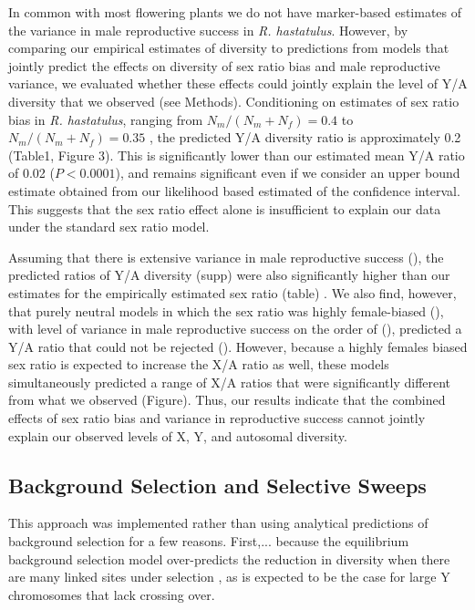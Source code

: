 \documentclass[9pt,twocolumn,twoside]{gsajnl}
\begin{document}
In common with most flowering plants we do not have marker-based estimates of the variance in male reproductive success in \textit{R. hastatulus}. However, by comparing our empirical estimates of diversity to predictions from models that jointly predict the effects on diversity of sex ratio bias and male reproductive variance, we evaluated whether these effects could jointly explain the level of Y/A diversity that we observed (see Methods). Conditioning on estimates of sex ratio bias in \textit{R. hastatulus}, ranging from $N_{m}/(N_{m}+N_{f})=0.4$ to $N_{m}/(N_{m}+N_{f})=0.35$ \citep{pickup2013influence}, the predicted Y/A diversity ratio  is approximately 0.2 (Table1, Figure 3). This is significantly lower than our estimated mean Y/A ratio of 0.02 ($\textit{P}<0.0001$), and remains significant even if we consider an upper bound estimate obtained from our likelihood based estimated of the confidence interval. This suggests that the sex ratio effect alone is insufficient to explain our data under the standard sex ratio model.

Assuming that there is extensive variance in male reproductive success (\X), the predicted ratios of Y/A diversity (\X supp) were also significantly higher than our estimates for the empirically estimated sex ratio (\X table) . We also find, however, that purely neutral models in which the sex ratio was highly female-biased (\X), with level of variance in male reproductive success on the order of (\X), predicted a Y/A ratio that could not be rejected (\X). However, because a highly females biased sex ratio is expected to increase the X/A ratio as well, these models simultaneously predicted a range of X/A ratios that were significantly different from what we observed (\X Figure). Thus, our results indicate that the combined effects of sex ratio bias and variance in reproductive success cannot jointly explain our observed levels of X, Y, and autosomal diversity.

\subsection*{Background Selection and Selective Sweeps}


This approach was implemented rather than using analytical predictions of background selection for a few reasons. First,... because the equilibrium background selection model over-predicts the reduction in diversity when there are many linked sites under selection \citep{KaiserCharlesworth}, as is expected to be the case for large Y chromosomes that lack crossing over.
\end{document}
